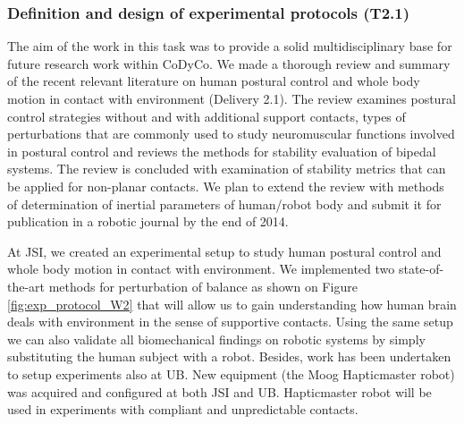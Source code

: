 \documentclass[12pt,a4paper,twoside]{article}
\begin{document}
\subsubsection{Definition and design of experimental protocols (T2.1)}

The aim of the work in this task was to provide a solid multidisciplinary base for future research work within CoDyCo. We made a thorough review and summary of the recent relevant literature on human postural control and whole body motion in contact with environment (Delivery 2.1). The review examines postural control strategies without and with additional support contacts, types of perturbations that are commonly used to study neuromuscular functions involved in postural control and reviews the methods for stability evaluation of bipedal systems. The review is concluded with examination of stability metrics that can be applied for non-planar contacts. We plan to extend the review with methods of determination of inertial parameters of human/robot body and submit it for publication in a robotic journal by the end of 2014.

At JSI, we created an experimental setup to study human postural control and whole body motion in contact with environment. We implemented two state-of-the-art methods for perturbation of balance as shown on Figure \ref{fig:exp_protocol_W2} that will allow us to gain understanding how human brain deals with environment in the sense of supportive contacts. Using the same setup we can also validate all biomechanical findings on robotic systems by simply substituting the human subject with a robot. Besides, work has been undertaken to setup experiments also at UB. New equipment (the Moog Hapticmaster robot) was acquired and configured at both JSI and UB. Hapticmaster robot will be used in experiments with compliant and unpredictable contacts.
\end{document}
